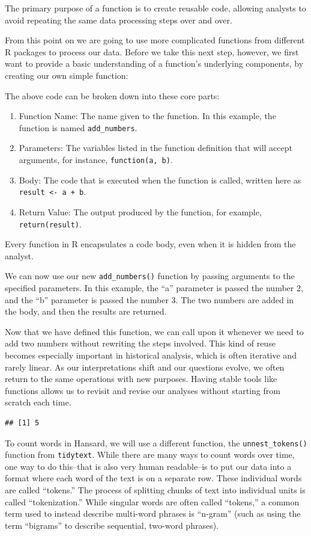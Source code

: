 \documentclass[
]{article}
\providecommand{\tightlist}{%
  \setlength{\itemsep}{0pt}\setlength{\parskip}{0pt}}
\begin{document}
The primary purpose of a function is to create reusable code, allowing
analysts to avoid repeating the same data processing steps over and
over.

From this point on we are going to use more complicated functions from
different R packages to process our data. Before we take this next step,
however, we first want to provide a basic understanding of a function's
underlying components, by creating our own simple function:

The above code can be broken down into these core parts:

\begin{enumerate}
\def\labelenumi{\arabic{enumi}.}
\tightlist
\item
  Function Name: The name given to the function. In this example, the
  function is named \texttt{add\_numbers}.
\item
  Parameters: The variables listed in the function definition that will
  accept arguments, for instance, \texttt{function(a,\ b)}.
\item
  Body: The code that is executed when the function is called, written
  here as \texttt{result\ \textless{}-\ a\ +\ b}.
\item
  Return Value: The output produced by the function, for example,
  \texttt{return(result)}.
\end{enumerate}

Every function in R encapsulates a code body, even when it is hidden
from the analyst.

We can now use our new \texttt{add\_numbers()} function by passing
arguments to the specified parameters. In this example, the ``a''
parameter is passed the number 2, and the ``b'' parameter is passed the
number 3. The two numbers are added in the body, and then the results
are returned.

Now that we have defined this function, we can call upon it whenever we
need to add two numbers without rewriting the steps involved. This kind
of reuse becomes especially important in historical analysis, which is
often iterative and rarely linear. As our interpretations shift and our
questions evolve, we often return to the same operations with new
purposes. Having stable tools like functions allows us to revisit and
revise our analyses without starting from scratch each time.

\begin{verbatim}
## [1] 5
\end{verbatim}

To count words in Hansard, we will use a different function, the
\texttt{unnest\_tokens()} function from \texttt{tidytext}. While there
are many ways to count words over time, one way to do this--that is also
very human readable--is to put our data into a format where each word of
the text is on a separate row. These individual words are called
``tokens.'' The process of splitting chunks of text into individual
units is called ``tokenization.'' While singular words are often called
``tokens,'' a common term used to instead describe multi-word phrases is
``n-gram'' (such as using the term ``bigrams'' to describe sequential,
two-word phrases).
\end{document}
